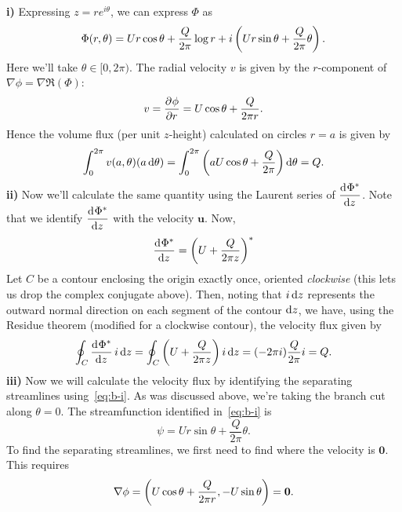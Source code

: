 \documentclass{article}
\def\*#1{\mathbf{#1}}
\begin{document}
\textbf{i)} Expressing $z = r e^{i \theta}$, we can express $\Phi$ as
%
\begin{equation}
    \Phi(r, \theta) = U r \cos \theta + \frac{Q}{2 \pi} \log r
    + i \del{U r \sin \theta + \frac{Q}{2 \pi} \theta}
    \label{eq:b-i}
    .
\end{equation}
%
Here we'll take $\theta \in [0, 2 \pi)$. The radial velocity $v$ is
given by the $r$-component of $\nabla \phi = \nabla \Re(\Phi)$:
%
\begin{equation*}
    v = \dpd{\phi}{r} = U \cos \theta + \frac{Q}{2 \pi r}
    .
\end{equation*}
%
Hence the volume flux (per unit $z$-height) calculated on circles $r =
a$ is given by
%
\begin{equation*}
    \int_0^{2 \pi} v(a, \theta) (a \dif \theta)
        = \int_0^{2 \pi} \del{a U \cos \theta + \frac{Q}{2 \pi}} \dif \theta
        = Q
        .
\end{equation*}
%
\textbf{ii)} Now we'll calculate the same quantity using the Laurent
series of $\dod{\Phi^*}{z}$. Note that we identify $\dod{\Phi^*}{z}$ with
the velocity $\*u$. Now,
%
\begin{equation*}
    \dod{\Phi^*}{z}
        = \del{U + \frac{Q}{2 \pi z}}^*
\end{equation*}
%
Let $C$ be a contour enclosing the origin exactly once, oriented
\textit{clockwise} (this lets us drop the complex conjugate above).
Then, noting that $i \dif z$ represents the outward normal direction on
each segment of the contour $\dif z$, we have, using the Residue theorem
(modified for a clockwise contour), the velocity flux given by
%
\begin{equation*}
    \oint_C \dod{\Phi^*}{z} i \dif z
        = \oint_C \del{U + \frac{Q}{2 \pi z}} i \dif z
        = (- 2 \pi i) \frac{Q}{2 \pi} i
        = Q
        .
\end{equation*}
%
\textbf{iii)} Now we will calculate the velocity flux by identifying the
separating streamlines using~\eqref{eq:b-i}. As was discussed above,
we're taking the branch cut along $\theta = 0$. The streamfunction
identified in~\eqref{eq:b-i} is
%
\begin{equation*}
    \psi = U r \sin \theta + \frac{Q}{2 \pi} \theta
    .
\end{equation*}
%
To find the separating streamlines, we first need to find where the
velocity is $\*0$. This requires
%
\begin{equation*}
    \nabla \phi = \del{U \cos \theta + \frac{Q}{2 \pi r}, - U \sin \theta} = \*0
    .
\end{equation*}
\end{document}
